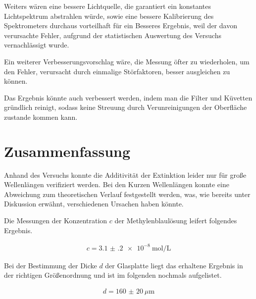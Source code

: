 \documentclass[11pt,ngerman]{scrartcl}
\begin{document}
\noindent Weiters wären eine bessere Lichtquelle, die garantiert ein konstantes
Lichtspektrum abstrahlen würde, sowie eine bessere Kalibrierung des
Spektrometers durchaus vorteilhaft für ein Besseres Ergebnis, weil der davon
verursachte Fehler, aufgrund der statistischen Auswertung des Versuchs
vernachlässigt wurde.

\noindent Ein weiterer Verbesserungsvorschlag wäre, die Messung öfter zu
wiederholen, um den Fehler, verursacht durch  einmalige Störfaktoren, besser
ausgleichen zu können.

\noindent Das Ergebnis könnte auch verbessert werden, indem man die Filter und
Küvetten gründlich reinigt, sodass keine Streuung durch Verunreinigungen der
Oberfläche zustande kommen kann.

\section{Zusammenfassung}

\noindent Anhand des Versuchs konnte die Additivität der Extinktion leider nur für große Wellenlängen verifiziert werden. Bei den Kurzen Wellenlängen konnte eine Abweichung zum theoretischen Verlauf festgestellt werden, was, wie bereits unter Diskussion erwähnt, verschiedenen Ursachen haben könnte.

\vspace{2mm}

\noindent Die Messungen der Konzentration $c$ der Methylenblaulösung leifert folgendes Ergebnis.

\begin{align*}
	c =  \SI{3.1(2)e-8}{\mol\per\liter}
\end{align*}

\noindent Bei der Bestimmung der Dicke $d$ der Glasplatte liegt das erhaltene Ergebnis in
der richtigen Größenordnung und ist im folgenden nochmals aufgelistet.

\begin{align*}
	d = \SI{160(20)}{\mu \meter}
\end{align*}

\newpage

\printbibliography
\listoffigures
\listoftables
\end{document}

